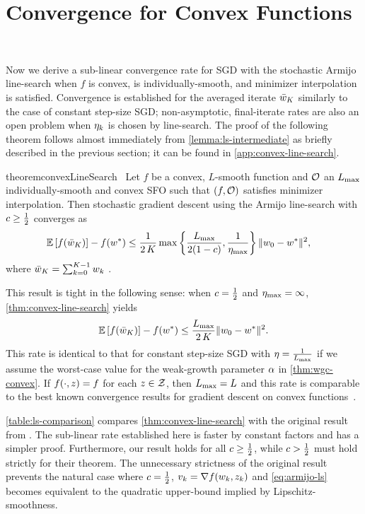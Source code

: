 \section{Convergence for Convex Functions}~\label{sec:ls-convex}

Now we derive a sub-linear convergence rate for \ac{SGD} with the stochastic Armijo line-search when \( f \) is convex, \oracle{} is individually-smooth, and minimizer interpolation is satisfied.
Convergence is established for the averaged iterate \( \bar \w_K \) similarly to the case of constant step-size \ac{SGD};\@
non-asymptotic, final-iterate rates are also an open problem when \( \etak \) is chosen by line-search.
The proof of the following theorem follows almost immediately from \autoref{lemma:ls-intermediate} as briefly described in the previous section; it can be found in \autoref{app:convex-line-search}.

\begin{restatable}{theorem}{convexLineSearch}~\label{thm:convex-line-search}
    Let \( f \) be a convex, \( L \)-smooth function and \( \oracle{} \) an \( \Lmax \) individually-smooth and convex \ac{SFO} such that \( \rbr{f, \oracle{}} \) satisfies minimizer interpolation.
    Then stochastic gradient descent using the Armijo line-search with \( c \geq \half \) converges as 
    \begin{align*}
        \E\sbr{f(\bar \w_K)} - f(\wopt) &\leq \frac{1}{2 \, K} \max\cbr{\frac{\Lmax}{2(1-c)}, \frac{1}{\etamax}} \norm{\w_0 - \wopt}^2, 
    \end{align*} 
    where \( \bar \w_K = \sum_{k=0}^{K-1} \wk \) .
\end{restatable}
This result is tight in the following sense: when \( c = \half \) and \( \etamax = \infty \), \autoref{thm:convex-line-search} yields 
\[  \E\sbr{f(\bar \w_K)} - f(\wopt) \leq \frac{\Lmax}{2 \, K} \norm{\w_0 - \wopt}^2. \]
This rate is identical to that for constant step-size \ac{SGD} with \( \eta = \frac{1}{\Lmax} \) if we assume the worst-case value for the weak-growth parameter \( \wgc \) in \autoref{thm:wgc-convex}.
If \( f(\cdot, \z) = f \) for each \( z \in \calZ \), then \( \Lmax = L \) and this rate is comparable to the best known convergence results for gradient descent on convex functions~\citep{bubeck2015convex}. 

\autoref{table:ls-comparison} compares \autoref{thm:convex-line-search} with the original result from  \citet[Theorem 2]{vaswani2019painless}.
The sub-linear rate established here is faster by constant factors and has a simpler proof.
Furthermore, our result holds for all \( c \geq \half \), while \( c > \half \) must hold strictly for their theorem. 
The unnecessary strictness of the original result prevents the natural case where \( c = \half \),  \( v_k = \grad(\wk, \zk) \) and \autoref{eq:armijo-ls} becomes equivalent to the quadratic upper-bound implied by Lipschitz-smoothness.\\

